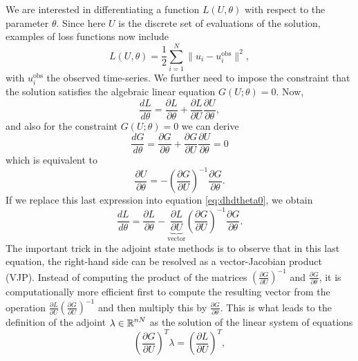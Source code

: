 We are interested in differentiating a function $L(U, \theta)$ with respect to the parameter $\theta$. 
Since here $U$ is the discrete set of evaluations of the solution, examples of loss functions now include 
\begin{equation}
    L(U, \theta) 
    = 
    \frac{1}{2} \sum_{i=1}^N \| u_i - u_i^\text{obs} \|^2, 
\end{equation}
with $u_i^\text{obs}$ the observed time-series. 
We further need to impose the constraint that the solution satisfies the algebraic linear equation $G(U; \theta) = 0$.
Now,
\begin{equation}
    \frac{dL}{d\theta} 
    = 
    \frac{\partial L}{\partial \theta} 
    + 
    \frac{\partial L}{\partial U} \frac{\partial U}{\partial \theta},
    \label{eq:dhdtheta0}
\end{equation}
and also for the constraint $G(U; \theta)=0$ we can derive
\begin{equation}
    \frac{dG}{d\theta} 
    = 
    \frac{\partial G}{\partial \theta} 
    + 
    \frac{\partial G}{\partial U} \frac{\partial U}{\partial \theta}
    =
    0
\end{equation}
which is equivalent to 
\begin{equation}
    \frac{\partial U}{\partial \theta} 
    = 
    - \left( \frac{\partial G}{\partial U} \right)^{-1} \frac{\partial G}{\partial \theta}.
\end{equation}
If we replace this last expression into equation \eqref{eq:dhdtheta0}, we obtain
\begin{equation}
    \frac{dL}{d\theta} 
    =
    \frac{\partial L}{\partial \theta} 
    - 
    \underbrace{\frac{\partial L}{\partial U}}_{\text{vector}}
    \left( \frac{\partial G}{\partial U} \right)^{-1} 
    \frac{\partial G}{\partial \theta}.
    \label{eq:dhdtheta}
\end{equation}
The important trick in the adjoint state methods is to observe that in this last equation, the right-hand side can be resolved as a vector-Jacobian product (VJP).
Instead of computing the product of the matrices $\left( \frac{\partial G}{\partial U} \right)^{-1}$ and $\frac{\partial G}{\partial \theta}$, it is computationally more efficient first to compute the resulting vector from the operation $\frac{\partial L}{\partial U} \left( \frac{\partial G}{\partial U} \right)^{-1}$ and then multiply this by $\frac{\partial G}{\partial \theta}$.
This is what leads to the definition of the adjoint $\lambda \in \operatorname{\mathbb{R}}^{nN}$ as the solution of the linear system of equations 
\begin{equation}
    \left( \frac{\partial G}{\partial U}\right)^T \lambda 
    =  
    \left( \frac{\partial L}{\partial U} \right)^T,
    \label{eq:adjoint-state-equation}
\end{equation}
